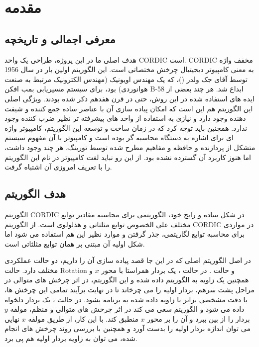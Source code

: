 \documentclass[12pt,titlepage,a4page , tikz , multi,table , svgnames,xcdraw]{article}
\begin{document}
\newpage
\pagestyle{fancy}
\fancyhf{}
\fancyfoot{}

\cfoot{\thepage}

\tableofcontents

\newpage

\section{مقدمه}

\subsection{معرفی اجمالی و تاریخچه}
هدف اصلی ما در این پروژه، طراحی یک واحد CORDIC است. CORDIC مخفف واژه  به معنی کامپیوتر دیجیتیال چرخش مختصاتی است. این الگوریتم اولین بار در سال 1956 توسط آقای جک ولدر ()،‌ که یک مهندس اویونیک (مهندس الکترونیک مرتبط به صنعت هوانوردی) بود،‌ برای سیستم مسیریابی بمب افکن B-58 ابداع شد. هر چند بعضی از ایده های استفاده شده در این روش،‌ حتی در قرن هفدهم ذکر شده بودند. ویژگی اصلی این الگوریتم هم این است که امکان پیاده سازی آن با عناصر ساده جمع کننده و شیفت دهنده وجود دارد و نیازی به استفاده از واحد های پیشرفته تر نظیر ضرب کننده وجود ندارد. همچنین باید توجه کرد که در زمان ساخت و توسعه این الگوریتم، کامپیوتر واژه ای برای اشاره به دستگاه محاسبه گر بوده است و کامپیوتر با آن مفهوم سیستم متشکل از پردازنده و حافظه و مفاهیم مطرح شده توسط تورینگ، هر چند وجود داشت،‌ اما هنوز کاربرد آن گسترده نشده بود. از این رو نباید لغت کامپیوتر در نام این الگوریتم را با تعریف امروزی آن اشتباه گرفت. \cite{birth} \cite{volder}



\subsection{هدف الگوریتم}
الگوریتم CORDIC در شکل ساده و رایج خود،‌ الگوریتمی برای محاسبه مقادیر توابع مختلف علی الخصوص توابع مثلثاتی و هذلولوی است. از الگوریتم CORDIC در مواردی برای محاسبه توابع لگاریتمی،‌ جذر گرفتن و موارد نظیر این هم استفاده می شود اما شکل اولیه آن مبتنی بر همان توابع مثلثاتی است.

در اصل الگوریتم اصلی که در این جا قصد پیاده سازی آن را داریم،‌ دو حالت عملکردی مختلف دارد. حالت Rotation و حالت . در حالت ، یک بردار همراستا با محور $x$ و همچنین یک زاویه به الگوریتم داده شده و این الگوریتم، در اثر چرخش های متوالی در مراحل پشت سرهم، بردار اولیه را می چرخاند تا در نهایت برآیند تمامی این چرخش ها،‌ با دقت مشخصی برابر با زاویه داده شده به برنامه بشود. در حالت ، یک بردار دلخواه داده می شود و الگوریتم سعی می کند در اثر چرخش های متوالی و منظم، مولفه $y$ بردار را از بین ببرد و آن را بر محور $x$ منطبق کند. با این کار، از طریق مولفه $x$ نهایی می توان اندازه بردار اولیه را بدست آورد و همچنین با بررسی روند چرخش های انجام شده،‌ می توان به زاویه بردار اولیه هم پی برد. \cite{volder} \cite{lakshmi} \cite{andraka}
\end{document}
